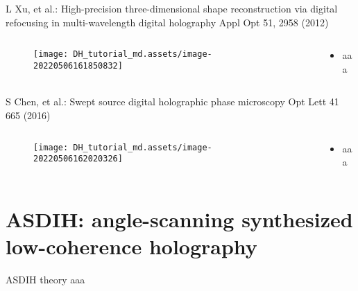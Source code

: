 \documentclass[t, aspectratio=169]{beamer}
\begin{document}
\begin{frame}{L Xu, et al.: High-precision three-dimensional shape reconstruction via digital refocusing in multi-wavelength digital holography}
	\vspace{-3 mm}
	\small Appl Opt 51, 2958 (2012)
	\begin{columns}
		\begin{column}{.6\textwidth}
			\begin{figure}
				\texttt{[image: DH\_tutorial\_md.assets/image-20220506161850832]}
			\end{figure}
		\end{column}
		\begin{column}{.4\textwidth}
			\begin{itemize}
				\item aaa
			\end{itemize}
		\end{column}
	\end{columns}
\end{frame}


\begin{frame}{S Chen, et al.: Swept source digital holographic phase microscopy}
	\vspace{-3 mm}
	\small Opt Lett 41 665 (2016)
	\begin{columns}
		\begin{column}{.6\textwidth}
			\begin{figure}
				\texttt{[image: DH\_tutorial\_md.assets/image-20220506162020326]}
			\end{figure}
		\end{column}
		\begin{column}{.4\textwidth}
			\begin{itemize}
				\item aaa
			\end{itemize}
		\end{column}
	\end{columns}
\end{frame}


\section{ASDIH: angle-scanning synthesized low-coherence holography}
\begin{frame}[c]
	\centering\LARGE\textbf{\secname}
\end{frame}



\begin{frame}{ASDIH theory}
aaa
\end{frame}
\end{document}
